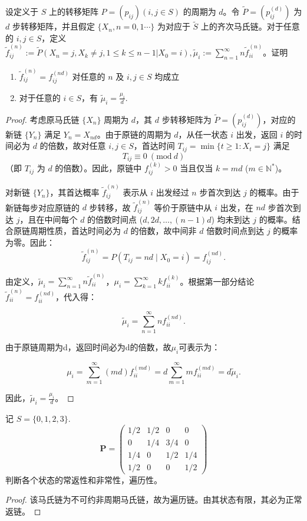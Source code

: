 \documentclass[lang=cn,10pt,thmcnt=section]{elegantbook}
\begin{document}
\begin{example}
	设定义于 $S$ 上的转移矩阵 $P = (p_{ij}) (i, j \in S)$ 的周期为 $d$。令 $\tilde{P} = (p_{ij}^{(d)})$ 为 $d$ 步转移矩阵，并且假定 $\{X_n, n = 0, 1 \cdots\}$ 为对应于 $\tilde{S}$ 上的齐次马氏链。对于任意的 $i, j \in S$，定义 $\tilde{f}_{ij}^{(n)} := \tilde{P}(X_n = j, X_k \neq j, 1 \leq k \leq n - 1 | X_0 = i), \tilde{\mu}_i := \sum_{n=1}^{\infty} n \tilde{f}_{ii}^{(n)}$。证明
    \begin{enumerate}
        \item $\tilde{f}_{ij}^{(n)} = f_{ij}^{(nd)}$ 对任意的 $n$ 及 $i, j \in S$ 均成立
        \item 对于任意的 $i \in S$，有 $\tilde{\mu}_i = \frac{\mu_i}{d}$.
    \end{enumerate}
\end{example}
\begin{proof}
	考虑原马氏链 $\{X_n\}$ 周期为 $d$，其 $d$ 步转移矩阵为 $\tilde{P} = (p_{ij}^{(d)})$，对应的新链 $\{Y_n\}$ 满足 $Y_n = X_{nd}$。由于原链的周期为 $d$，从任一状态 $i$ 出发，返回 $i$ 的时间必为 $d$ 的倍数，故对任意 $i, j \in S$，首达时间 $T_{ij} = \min\{t \geq 1: X_t = j\}$ 满足
	\[
	T_{ij} \equiv 0 \ (\text{mod} \ d)
	\]
	（即 $T_{ij}$ 为 $d$ 的倍数）。因此，原链中 $f_{ij}^{(k)} > 0$ 当且仅当 $k = md$ ($m \in \mathbb{N}^*$)。
	
	对新链 $\{Y_n\}$，其首达概率 $\tilde{f}_{ij}^{(n)}$ 表示从 $i$ 出发经过 $n$ 步首次到达 $j$ 的概率。由于新链每步对应原链的 $d$ 步转移，故 $\tilde{f}_{ij}^{(n)}$ 等价于原链中从 $i$ 出发，在 $nd$ 步首次到达 $j$，且在中间每个 $d$ 的倍数时间点 ($d, 2d, \ldots, (n-1)d$) 均未到达 $j$ 的概率。结合原链周期性质，首达时间必为 $d$ 的倍数，故中间非 $d$ 倍数时间点到达 $j$ 的概率为零。因此：
\[
\tilde{f}_{ij}^{(n)} = P(T_{ij} = nd \mid X_0 = i) = f_{ij}^{(nd)}.
\]


由定义，$\tilde{\mu}_i = \sum_{n=1}^{\infty} n \tilde{f}_{ii}^{(n)}$，$\mu_i = \sum_{k=1}^{\infty} k f_{ii}^{(k)}$。根据第一部分结论$\tilde{f}_{ii}^{(n)} = f_{ii}^{(nd)}$，代入得：

\[
\tilde{\mu}_i = \sum_{n=1}^{\infty} n f_{ii}^{(nd)}.
\]

由于原链周期为d，返回时间必为d的倍数，故$\mu_i$可表示为：

\[
\mu_i = \sum_{m=1}^{\infty} (md) f_{ii}^{(md)} = d \sum_{m=1}^{\infty} m f_{ii}^{(md)} = d \tilde{\mu}_i.
\]

因此，$\tilde{\mu}_i = \frac{\mu_i}{d}$。
\end{proof}
\begin{example}
	记 $S = \{0, 1, 2, 3\}$.
    \[
    \mathbf{P} = \begin{pmatrix}
    1/2 & 1/2 & 0 & 0 \\
    0 & 1/4 & 3/4 & 0 \\
    1/4 & 0 & 1/2 & 1/4 \\
    1/2 & 0 & 0 & 1/2
    \end{pmatrix}
    \]
    判断各个状态的常返性和非常性，遍历性。
\end{example}
\begin{proof}
	该马氏链为不可约非周期马氏链，故为遍历链。由其状态有限，其必为正常返链。
\end{proof}
\end{document}
